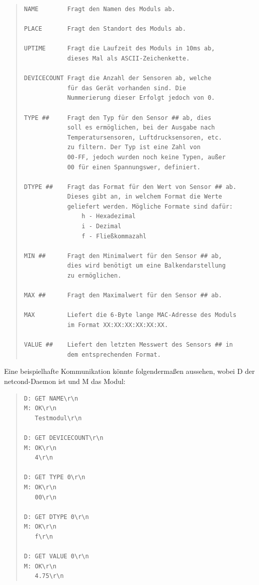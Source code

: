 \documentclass[a4paper,14pt,headsepline]{scrartcl}
\begin{document}
\begin{quote}
\begin{verbatim}
NAME        Fragt den Namen des Moduls ab.

PLACE       Fragt den Standort des Moduls ab.

UPTIME      Fragt die Laufzeit des Moduls in 10ms ab,
            dieses Mal als ASCII-Zeichenkette.
            
DEVICECOUNT Fragt die Anzahl der Sensoren ab, welche
            für das Gerät vorhanden sind. Die
            Nummerierung dieser Erfolgt jedoch von 0.

TYPE ##     Fragt den Typ für den Sensor ## ab, dies 
            soll es ermöglichen, bei der Ausgabe nach
            Temperatursensoren, Luftdrucksensoren, etc.
            zu filtern. Der Typ ist eine Zahl von
            00-FF, jedoch wurden noch keine Typen, außer
            00 für einen Spannungswer, definiert.
            
DTYPE ##    Fragt das Format für den Wert von Sensor ## ab.
            Dieses gibt an, in welchem Format die Werte
            geliefert werden. Mögliche Formate sind dafür:
                h - Hexadezimal
                i - Dezimal
                f - Fließkommazahl
                
MIN ##      Fragt den Minimalwert für den Sensor ## ab,
            dies wird benötigt um eine Balkendarstellung
            zu ermöglichen.
            
MAX ##      Fragt den Maximalwert für den Sensor ## ab.

MAX         Liefert die 6-Byte lange MAC-Adresse des Moduls
            im Format XX:XX:XX:XX:XX:XX.
            
VALUE ##    Liefert den letzten Messwert des Sensors ## in
            dem entsprechenden Format.
\end{verbatim}
\end{quote}
Eine beispielhafte Kommunikation könnte folgendermaßen aussehen, wobei D der netcond-Daemon ist und M das Modul:
\begin{quote}
\begin{verbatim}
D: GET NAME\r\n
M: OK\r\n
   Testmodul\r\n
   
D: GET DEVICECOUNT\r\n
M: OK\r\n
   4\r\n
   
D: GET TYPE 0\r\n
M: OK\r\n
   00\r\n
   
D: GET DTYPE 0\r\n
M: OK\r\n
   f\r\n
   
D: GET VALUE 0\r\n
M: OK\r\n
   4.75\r\n
\end{verbatim}
\end{quote}
\end{document}

